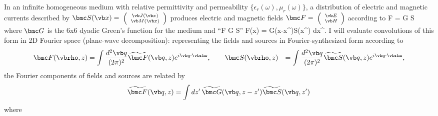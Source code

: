 \documentclass[letterpaper]{article}
\renewcommand{\wt}{\widetilde}
\begin{document}
In an infinite homogeneous medium with relative permittivity and
permeability $\{\epsilon_r(\omega),\mu_r(\omega)\}$,
a distribution of electric and magnetic currents described by
$\bmc S(\vb x)=\hbox{\scriptsize{
 $\left(\begin{array}{c} \vb J(\vb x) \\ \vb M(\vb x)\end{array}\right)$}}$
produces electric and magnetic fields
$\bmc F=\hbox{\scriptsize{
 $\left(\begin{array}{c} \vb E \\ \vb H\end{array}\right)$}}$
according to
{  \bmc F = \bmc G \star \bmc S
}
where $\bmc G$ is the 6x6 dyadic Green's function for the medium
and 
{
``\bmc F \equiv \bmc G \star \bmc S''
   \quad \Longrightarrow \quad 
    \bmc F(\vb x) = 
    \int
      \bmc G(\vb x-\vb x^\prime)\cdot \bmc S(\vb x^\prime)
    d\vb x^\prime.
}
I will evaluate convolutions of this form in 2D Fourier space
(plane-wave decomposition): representing the fields and sources
in Fourier-synthesized form according to
\begin{align*}
 \bmc F(\vbrho, z)
&=\int \frac{d^2 \vb q}{(2 \pi)^2} 
  \wt{\bmc F}(\vb q,z) e^{i\vb q \cdot \vbrho},
\qquad
 \bmc S(\vbrho, z)
&=\int \frac{d^2 \vb q}{(2 \pi)^2} 
  \wt{\bmc S}(\vb q,z) e^{i\vb q \cdot \vbrho},
\end{align*}
the Fourier components of fields and sources are related by
$$\wt{\bmc F}(\vb q,z)=\int dz^\prime \, 
  \wt{\bmc G}(\vb q,z-z^\prime)\wt{\bmc S}(\vb q,z^\prime)
$$
where
\end{document}

